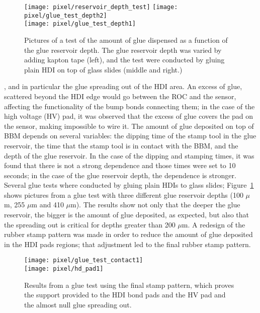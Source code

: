 \bit
  \begin{figure}[!h]
  \centering
  \texttt{[image: pixel/reservoir\_depth\_test]}
  \texttt{[image: pixel/glue\_test\_depth2]}\\
  \texttt{[image: pixel/glue\_test\_depth1]}
  \caption[Test of amount of glue deposited.]{Pictures of a test of the amount of glue dispensed as a function of the glue reservoir depth. The glue reservoir depth was varied by adding kapton tape (left), and the test were conducted by gluing plain HDI on top of glass slides (middle and right.)}\label{fig:glue_test_depth}
\end{figure}

\item {}, and in particular the glue spreading out of the HDI area. An excess of glue, scattered beyond the HDI edge would go between the ROC and the sensor, affecting the functionality of the bump bonds connecting them; in the case of the high voltage (HV) pad, it was observed that the excess of glue covers the pad on the sensor, making impossible to wire it. The amount of glue deposited on  top of BBM depends on several variables: the dipping time of the stamp tool in the glue reservoir, the time that the stamp tool is in contact with the BBM, and the depth of the glue reservoir. In the case of the dipping and stamping times, it was found that there is not a strong dependence and those times were set to 10 seconds; in the case of the glue reservoir depth, the dependence is stronger. Several glue tests where conducted by gluing plain HDIs to glass slides; Figure~\ref{fig:glue_test_depth} shows pictures from a glue test with three different glue reservoir depths (100 $\mu$m, 255 $\mu$m and 410 $\mu$m). The results show not only that the deeper the glue reservoir, the bigger is the amount of glue deposited, as expected, but also that the spreading out is critical for depths greater than 200 $\mu$m. A redesign of the rubber stamp pattern was made in order to reduce the amount of glue deposited in the HDI pads regions; that adjustment led to the final rubber stamp pattern.

\begin{figure}[!h]
  \centering  
  \texttt{[image: pixel/glue\_test\_contact1]}\\
  \texttt{[image: pixel/hd\_pad1]}
  \caption[Glue contact area test.]{Results from a glue test using the final stamp pattern, which proves the support provided to the HDI bond pads and the HV pad and the almost null glue spreading out.}\label{fig:glue_test}
\end{figure}

